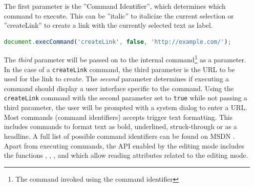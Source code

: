 \begin{table}[]
\centering
{}
\caption{execCommand parameters}
\label{table:execcommand_parameters}
\end{table}


The first parameter is the ''Command Identifier'', which determines which command to execute. This can be ''italic'' to italicize the current selection or ''createLink'' to create a link with the currently selected text as label.

\begin{lstlisting}[language=JavaScript, caption=Creating a link using the HTML editing API, label=lst:execcommand-link]
document.execCommand('createLink', false, 'http://example.com/');
\end{lstlisting}

The \textit{third} parameter will be passed on to the internal command\footnote{The command invoked using the command identifier} as a parameter. In the case of a \texttt{createLink} command, the third parameter is the URL to be used for the link to create. The \textit{second} parameter determines if executing a command should display a user interface specific to the command. Using the \texttt{createLink} command with the second parameter set to \texttt{true} while not passing a third parameter, the user will be prompted with a system dialog to enter a URL. Most commands (command identifiers)  accepts trigger text formatting. This includes commands to format text as bold, underlined, struck-through or as a headline. A full list of possible command identifiers can be found on MSDN \cite{an}. Apart from executing commands, the API enabled by the editing mode includes the functions , , ,  and  which allow reading attributes related to the editing mode. %

